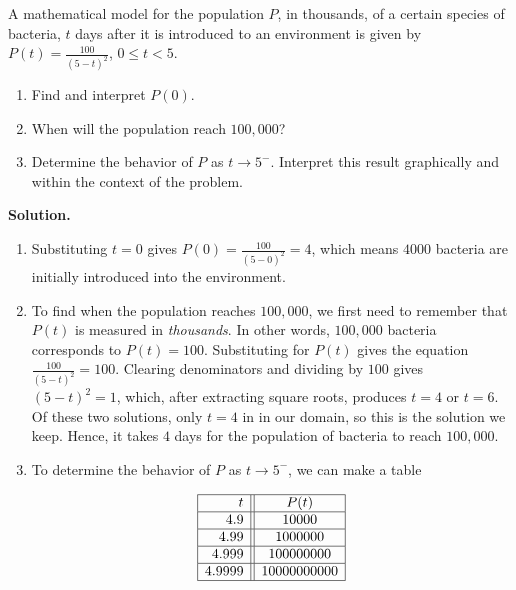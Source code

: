 \begin{ex}  A mathematical model for the population $P$, in thousands, of a certain species of bacteria, $t$ days after it is introduced to an environment is given by $P(t) = \frac{100}{(5-t)^{2}}$, $0 \leq t < 5$.


\begin{enumerate}

\item  Find and interpret $P(0)$.

\item  When will the population reach $100,\!000$?

\item  Determine the behavior of $P$ as $t \rightarrow 5^{-}$.  Interpret this result graphically and within the context of the problem. 

\end{enumerate}

{ \bf Solution.}  

\begin{enumerate}

\item  Substituting $t=0$ gives $P(0) = \frac{100}{(5-0)^2} = 4$, which means $4000$ bacteria are initially introduced into the environment.

\item  To find when the population reaches $100,\! 000$, we first need to remember that $P(t)$ is measured in \textit{thousands}.  In other words, $100,\! 000$ bacteria corresponds to $P(t) = 100$.  Substituting for $P(t)$ gives the equation  $\frac{100}{(5-t)^2} = 100$.  Clearing denominators and dividing by $100$ gives $(5-t)^2=1$, which, after extracting square roots, produces $t = 4$ or $t=6$.  Of these two solutions, only $t=4$ in in our domain, so this is the solution we keep.  Hence, it takes $4$ days for the population of bacteria to reach $100,\! 000$.

\item To determine the behavior of $P$ as $t \rightarrow 5^{-}$, we can make a table

\[\begin{array}{|r||c|}  \hline

  t & P(t)  \\ \hline
 4.9 & 10000  \\  \hline
 4.99 & 1000000  \\  \hline
 4.999 &  100000000  \\  \hline
  4.9999 & 10000000000  \\  \hline
  \end{array}\]


\end{enumerate}
\end{ex}
